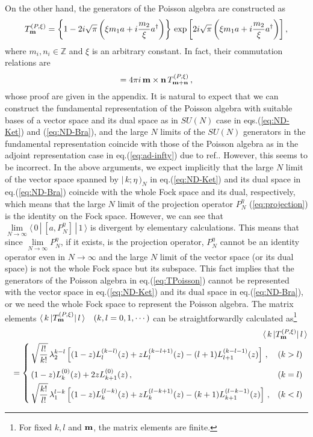 \documentclass[a4paper,12pt]{article}
\newcommand{\Integer}{\mathbb Z}
\newcommand{\bra}[1]{\langle\,#1\,|}
\newcommand{\ket}[1]{|\,#1\,\rangle}
\newcommand{\Nket}[1]{|\,#1\,)_N}
\newcommand{\nn}{\nonumber\\}
\begin{document}
On the other hand, the generators of the Poisson algebra are
constructed as
\begin{equation}
 T^{(P,\xi)}_{\bf m}
  =\left\{1-2i\sqrt{\pi}
	\left(\xi m_1a+i\frac{m_2}{\xi}a^\dagger\right)\right\}\,
	\exp\left[2i\sqrt{\pi}
	\left(\xi m_1a+i\frac{m_2}{\xi}a^\dagger\right)\right],
  \label{eq:TPoisson}
\end{equation}
where $m_i,n_i \in \Integer$ and $\xi$ is an arbitrary constant.
In fact, their commutation relations are
\begin{equation}
 [\, T^{(P,\xi)}_{\bf m},T^{(P,\xi)}_{\bf n}\,]
  = 4\pi i\,{\bf m\times n}\,T^{(P,\xi)}_{\bf m+n}\,,
  \label{eq:ComTPoisson}
\end{equation}
whose proof are given in the appendix.
It is natural to expect that we can construct the fundamental
representation of the Poisson algebra with suitable bases of a
vector space and its dual space as in $SU(N)$ case in
eqs.(\ref{eq:ND-Ket}) and (\ref{eq:ND-Bra}), and the large $N$ limits
of the $SU(N)$ generators in the fundamental representation
coincide with those of the Poisson algebra as in the adjoint
representation case in eq.(\ref{eq:ad-infty}) due to
ref.\cite{zunger}. However, this seems to be incorrect.
In the above arguments, we expect implicitly that the large $N$ limit
of the vector space spanned by $\Nket{k;\eta}$ in eq.(\ref{eq:ND-Ket})
and its dual space in eq.(\ref{eq:ND-Bra}) coincide with the whole
Fock space and its dual, respectively, which means that the large $N$
limit of the projection operator $P^\eta_N$ (\ref{eq:projection}) is
the identity on the Fock space. However, we can see that
$\mathop{\lim}\limits_{N\rightarrow\infty}\bra{0}\,[a,P^\eta_N]\,
\ket{1}$ is divergent by elementary calculations. This means that
since $\mathop{\lim}\limits_{N\rightarrow\infty}P^\eta_N$, if it
exists, is the projection operator, $P^\eta_N$ cannot be an identity
operator even in $N\rightarrow\infty$ and the large $N$ limit of the
vector space (or its dual space) is not the whole Fock space but its
subspace. This fact implies that the generators of the Poisson algebra
in eq.(\ref{eq:TPoisson}) cannot be represented with the vector space
in eq.(\ref{eq:ND-Ket}) and its dual space in eq.(\ref{eq:ND-Bra}),
or we need the whole Fock space to represent the Poisson algebra.
The matrix elements $\bra{k} T^{(P,\xi)}_{\bf m} \ket{l}\quad
(k,l=0,1,\cdots)$ can be straightforwardly calculated as\footnote{
For fixed $k,l$ and ${\bf m}$, the matrix elements are finite.}
\begin{eqnarray}
 &&\hspace{-3ex}\bra{k} T^{(P,\xi)}_{\bf m} \ket{l}\nn
 &&=\left\{\renewcommand{\arraystretch}{2}\begin{array}{@{\,}ll}
   \displaystyle \sqrt{\frac{l!}{k!}}\,\lambda_2^{k-l}
	\left[(1-z) L_l^{(k-l)}(z) + z L_l^{(k-l+1)}(z)
	- (l+1)	L_{l+1}^{(k-l-1)}(z)   \right]\,, & (k>l)\\
   \displaystyle (1-z)L_k^{(0)}(z) + 2z L_{k+1}^{(0)}(z)\,,&(k=l)\\
   \displaystyle \sqrt{\frac{k!}{l!}}\,\lambda_1^{l-k}
	\left[(1-z) L_k^{(l-k)}(z) + z L_k^{(l-k+1)}(z)
	- (k+1) L_{k+1}^{(l-k-1)}(z)   \right]\,, & (k<l)
 \end{array}\right.
\end{eqnarray}
\end{document}
